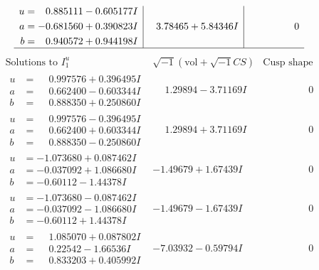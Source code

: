 \documentclass[1p]{elsarticle_modified}
\theoremstyle{definition}
\newcommand{\I}{\sqrt{-1}}
\begin{document}
$$\begin{array}{c|c|c}
\begin{aligned}
u &= \phantom{-}0.885111 - 0.605177 I \\
a &= -0.681560 + 0.390823 I \\
b &= \phantom{-}0.940572 + 0.944198 I\end{aligned}
 & \phantom{-}3.78465 + 5.84346 I & \phantom{-0.000000 } 0\\
 \hline 
 \end{array}$$\newpage$$\begin{array}{c|c|c}  
\text{Solutions to }I^u_{1}& \I (\text{vol} + \sqrt{-1}CS) & \text{Cusp shape}\\
 \hline 
\begin{aligned}
u &= \phantom{-}0.997576 + 0.396495 I \\
a &= \phantom{-}0.662400 - 0.603344 I \\
b &= \phantom{-}0.888350 + 0.250860 I\end{aligned}
 & \phantom{-}1.29894 - 3.71169 I & \phantom{-0.000000 } 0 \\ \hline\begin{aligned}
u &= \phantom{-}0.997576 - 0.396495 I \\
a &= \phantom{-}0.662400 + 0.603344 I \\
b &= \phantom{-}0.888350 - 0.250860 I\end{aligned}
 & \phantom{-}1.29894 + 3.71169 I & \phantom{-0.000000 } 0 \\ \hline\begin{aligned}
u &= -1.073680 + 0.087462 I \\
a &= -0.037092 + 1.086680 I \\
b &= -0.60112 - 1.44378 I\end{aligned}
 & -1.49679 + 1.67439 I & \phantom{-0.000000 } 0 \\ \hline\begin{aligned}
u &= -1.073680 - 0.087462 I \\
a &= -0.037092 - 1.086680 I \\
b &= -0.60112 + 1.44378 I\end{aligned}
 & -1.49679 - 1.67439 I & \phantom{-0.000000 } 0 \\ \hline\begin{aligned}
u &= \phantom{-}1.085070 + 0.087802 I \\
a &= \phantom{-}0.22542 - 1.66536 I \\
b &= \phantom{-}0.833203 + 0.405992 I\end{aligned}
 & -7.03932 - 0.59794 I & \phantom{-0.000000 } 0 \\ \hline\begin{aligned}

\end{aligned}
\end{array}$$
\end{document}
